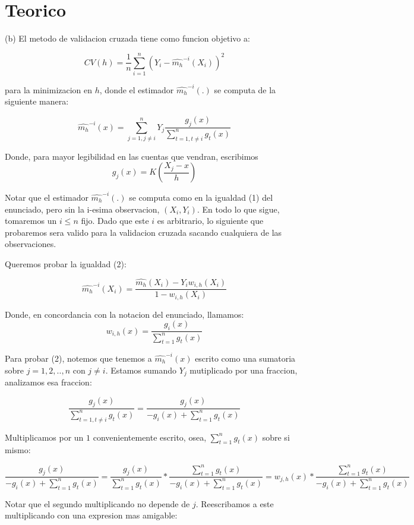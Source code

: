 \documentclass{article}
\begin{document}
\section{Teorico}
(b) El metodo de validacion cruzada tiene como funcion objetivo a:

$$ CV(h) = \frac{1}{n}\sum_{i=1}^n (Y_i - \widehat{m_h}^{-i}(X_i))^2 $$

para la minimizacion en $h$, donde el estimador $\widehat{m_h}^{-i}(.)$ se computa de la siguiente manera:

$$ \widehat{m_h}^{-i}(x) =  \sum_{j=1, j \neq i}^n Y_j \frac{g_j(x)}{\sum\limits_{t=1,t\neq i}^n g_t(x)}$$

Donde, para mayor legibilidad en las cuentas que vendran, escribimos $$ g_j(x) = K \left( \frac{X_j - x}{h}\right)$$

Notar que el estimador $\widehat{m_h}^{-i}(.)$ se computa como en la igualdad (1) del enunciado, pero sin la i-esima observacion, $(X_i, Y_i)$. En todo lo que sigue, tomaremos un $i \leq n$ fijo. Dado que este $i$ es arbitrario, lo siguiente que probaremos sera valido para la validacion cruzada sacando cualquiera de las observaciones.

$$$$
Queremos probar la igualdad (2):

$$\widehat{m_h}^{-i}(X_i) = \frac{\widehat{m_h}(X_i) - Y_i w_{i,h}(X_i)}{1 - w_{i,h}(X_i)}$$

Donde, en concordancia con la notacion del enunciado, llamamos:
$$w_{i,h}(x) = \frac{g_i(x)}{\sum\limits_{t=1}^n g_t(x)}$$

$$$$
Para probar (2), notemos que tenemos a $\widehat{m_h}^{-i}(x)$ escrito como una sumatoria sobre $j = 1, 2, .., n$ con $j\neq i$. Estamos sumando $Y_j$ mutiplicado por una fraccion, analizamos esa fraccion:

$$
\frac{g_j(x)}{\sum\limits_{t=1,t\neq i}^n g_t(x)} = \frac{g_j(x)}{ -g_i(x) +\sum\limits_{t=1}^n g_t(x)}
$$
\pagebreak

Multiplicamos por un $1$ convenientemente escrito, osea, $\sum\limits_{t=1}^n g_t(x)$ sobre si mismo:

$$\frac{g_j(x)}{ -g_i(x) +\sum\limits_{t=1}^n g_t(x)} =  \frac{g_j(x)}{\sum\limits_{t=1}^n g_t(x)} * \frac{\sum\limits_{t=1}^n g_t(x)}{ -g_i(x) +\sum\limits_{t=1}^n g_t(x)} = w_{j,h}(x) * \frac{\sum\limits_{t=1}^n g_t(x)}{ -g_i(x) +\sum\limits_{t=1}^n g_t(x)}$$

Notar que el segundo multiplicando no depende de $j$. Reescribamos a este multiplicando con una expresion mas amigable:
\end{document}
